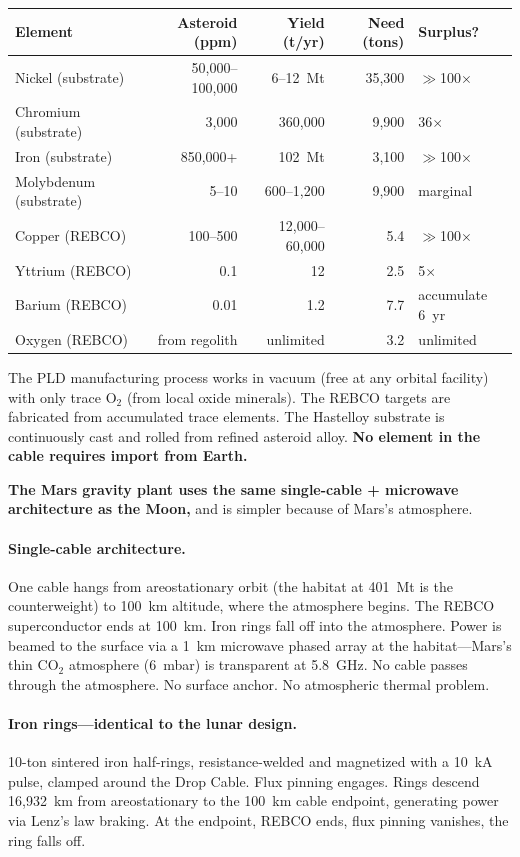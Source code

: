 \documentclass[12pt,letterpaper]{article}
\begin{document}
\begin{center}
\small
\begin{tabular}{lrrrl}
\toprule
\textbf{Element} & \textbf{Asteroid (ppm)} & \textbf{Yield (t/yr)} & \textbf{Need (tons)} & \textbf{Surplus?} \\
\midrule
Nickel (substrate) & 50{,}000--100{,}000 & 6--12~Mt & 35{,}300 & $\gg$100$\times$ \\
Chromium (substrate) & 3{,}000 & 360{,}000 & 9{,}900 & 36$\times$ \\
Iron (substrate) & 850{,}000+ & 102~Mt & 3{,}100 & $\gg$100$\times$ \\
Molybdenum (substrate) & 5--10 & 600--1{,}200 & 9{,}900 & marginal \\
Copper (REBCO) & 100--500 & 12{,}000--60{,}000 & 5.4 & $\gg$100$\times$ \\
Yttrium (REBCO) & 0.1 & 12 & 2.5 & 5$\times$ \\
Barium (REBCO) & 0.01 & 1.2 & 7.7 & accumulate 6~yr \\
Oxygen (REBCO) & from regolith & unlimited & 3.2 & unlimited \\
\bottomrule
\end{tabular}
\end{center}

The PLD manufacturing process works in vacuum (free at any orbital facility) with only trace O$_2$ (from local oxide minerals). The REBCO targets are fabricated from accumulated trace elements. The Hastelloy substrate is continuously cast and rolled from refined asteroid alloy. \textbf{No element in the cable requires import from Earth.}

\textbf{The Mars gravity plant uses the same single-cable + microwave architecture as the Moon,} and is simpler because of Mars's atmosphere.

\paragraph{Single-cable architecture.}
One cable hangs from areostationary orbit (the habitat at 401~Mt is the counterweight) to 100~km altitude, where the atmosphere begins. The REBCO superconductor ends at 100~km. Iron rings fall off into the atmosphere. Power is beamed to the surface via a 1~km microwave phased array at the habitat---Mars's thin CO$_2$ atmosphere (6~mbar) is transparent at 5.8~GHz. No cable passes through the atmosphere. No surface anchor. No atmospheric thermal problem.

\paragraph{Iron rings---identical to the lunar design.}
10-ton sintered iron half-rings, resistance-welded and magnetized with a 10~kA pulse, clamped around the Drop Cable. Flux pinning engages. Rings descend 16{,}932~km from areostationary to the 100~km cable endpoint, generating power via Lenz's law braking. At the endpoint, REBCO ends, flux pinning vanishes, the ring falls off.
\end{document}
